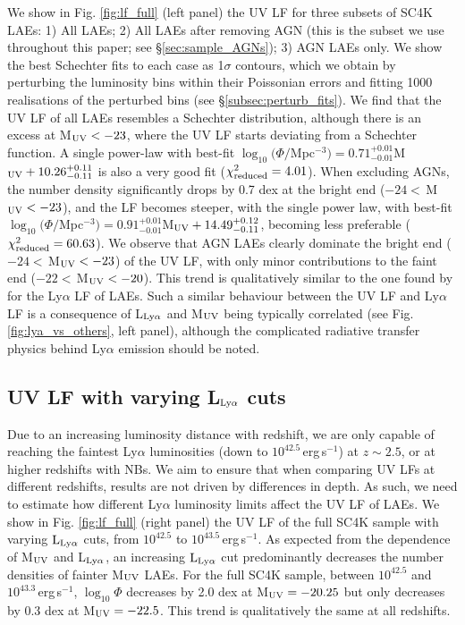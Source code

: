 \documentclass[a4paper,fleqn,usenatbib]{mnras}
\begin{document}
We show in Fig. \ref{fig:lf_full} (left panel) the UV LF for three subsets of SC4K LAEs: 1) All LAEs; 2) All LAEs after removing AGN (this is the subset we use throughout this paper; see \S\ref{sec:sample_AGNs}); 3) AGN LAEs only. We show the best Schechter fits to each case as 1$\sigma$ contours, which we obtain by perturbing the luminosity bins within their Poissonian errors and fitting 1000 realisations of the perturbed bins (see \S\ref{subsec:perturb_fits}). We find that the UV LF of all LAEs resembles a Schechter distribution, although there is an excess at M$_{\rm UV}<-23$, where the UV LF starts deviating from a Schechter function. A single power-law with best-fit $\log_{10}(\Phi/$Mpc$^{-3})=0.71^{+0.01}_{-0.01}$M$_{\rm UV}+10.26^{+0.11}_{-0.11}$ is also a very good fit ($\chi^2_{\rm reduced}=4.01$). When excluding AGNs, the number density significantly drops by 0.7 dex at the bright end ($-24<$\,M$_{\rm UV}<-23$), and the LF becomes steeper, with the single power law, with best-fit $\log_{10}(\Phi/$Mpc$^{-3})=0.91^{+0.01}_{-0.01}$M$_{\rm UV}+14.49^{+0.12}_{-0.11}$, becoming less preferable ($\chi^2_{\rm reduced}=60.63$). We observe that AGN LAEs clearly dominate the bright end ($-24<$\,M$_{\rm UV}<-23$) of the UV LF, with only minor contributions to the faint end ($-22<$\,M$_{\rm UV}<-20$). This trend is qualitatively similar to the one found by \cite{Sobral2018} for the Ly$\alpha$ LF of LAEs. Such a similar behaviour between the UV LF and Ly$\alpha$ LF is a consequence of L$_{\rm Ly\alpha}$ and M$_{\rm UV}$ being typically correlated (see Fig. \ref{fig:lya_vs_others}, left panel), although the complicated radiative transfer physics behind Ly$\alpha$ emission should be noted. 




\subsection{UV LF with varying {\rm L$_{\rm Ly\alpha}$} cuts} \label{sec:muv_vary}

Due to an increasing luminosity distance with redshift, we are only capable of reaching the faintest Ly$\alpha$ luminosities (down to $10^{42.5}$\,erg\,s$^{-1}$) at $z\sim2.5$, or at higher redshifts with NBs. We aim to ensure that when comparing UV LFs at different redshifts, results are not driven by differences in depth. As such, we need to estimate how different Ly$\alpha$ luminosity limits affect the UV LF of LAEs. We show in Fig. \ref{fig:lf_full} (right panel) the UV LF of the full SC4K sample with varying ${\rm L_{Ly\alpha}}$ cuts, from $10^{42.5}$ to $10^{43.5}$\,erg\,s$^{-1}$. As expected from the dependence of M$_{\rm UV}$ and L$_{\rm Ly\alpha}$, an increasing ${\rm L_{Ly\alpha}}$ cut predominantly decreases the number densities of fainter M$_{\rm UV}$ LAEs. For the full SC4K sample, between $10^{42.5}$ and $10^{43.3}$\,erg\,s$^{-1}$, $\log_{10}\Phi$ decreases by 2.0 dex at M$_{\rm UV}=-20.25$ but only decreases by 0.3 dex at M$_{\rm UV}=-22.5$. This trend is qualitatively the same at all redshifts.
\end{document}
